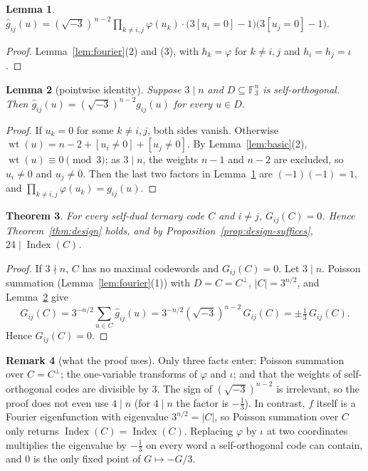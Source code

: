 \documentclass[11pt]{amsart}
\newtheorem{theorem}{Theorem}[section]
\newtheorem{lemma}[theorem]{Lemma}
\theoremstyle{definition}
\newtheorem{remark}[theorem]{Remark}
\newcommand{\F}{\mathbb{F}_3}
\newcommand{\wt}{\operatorname{wt}}
\newcommand{\Index}{\operatorname{Index}}
\newcommand{\isq}{\sqrt{-3}}
\begin{document}
\begin{lemma}\label{lem:ghat}
$\displaystyle\hat g_{ij}(u)=(\isq)^{\,n-2}\prod_{k\ne i,j}\varphi(u_k)\cdot\bigl(3[u_i=0]-1\bigr)\bigl(3[u_j=0]-1\bigr).$
\end{lemma}

\begin{proof}
Lemma~\ref{lem:fourier}(2) and (3), with $h_k=\varphi$ for $k\ne i,j$ and $h_i=h_j=\iota$.
\end{proof}

\begin{lemma}[pointwise identity]\label{lem:pointwise}
Suppose $3\mid n$ and $D\subseteq\F^n$ is self-orthogonal. Then $\hat g_{ij}(u)=(\isq)^{n-2}g_{ij}(u)$
for every $u\in D$.
\end{lemma}

\begin{proof}
If $u_k=0$ for some $k\ne i,j$, both sides vanish. Otherwise $\wt(u)=n-2+[u_i\ne0]+[u_j\ne0]$. By
Lemma~\ref{lem:basic}(2), $\wt(u)\equiv0\pmod3$; as $3\mid n$, the weights $n-1$ and $n-2$ are
excluded, so $u_i\ne0$ and $u_j\ne0$. Then the last two factors in Lemma~\ref{lem:ghat} are
$(-1)(-1)=1$, and $\prod_{k\ne i,j}\varphi(u_k)=g_{ij}(u)$.
\end{proof}

\begin{theorem}\label{thm:C}
For every self-dual ternary code $C$ and $i\ne j$, $G_{ij}(C)=0$. Hence Theorem~\ref{thm:design}
holds, and by Proposition~\ref{prop:design-suffices}, $24\mid\Index(C)$.
\end{theorem}

\begin{proof}
If $3\nmid n$, $C$ has no maximal codewords and $G_{ij}(C)=0$. Let $3\mid n$. Poisson summation
(Lemma~\ref{lem:fourier}(1)) with $D=C=C^\perp$, $|C|=3^{n/2}$, and Lemma~\ref{lem:pointwise} give
\[
  G_{ij}(C)=3^{-n/2}\sum_{u\in C}\hat g_{ij}(u)=3^{-n/2}(\isq)^{n-2}\,G_{ij}(C)=\pm\tfrac13\,G_{ij}(C).
\]
Hence $G_{ij}(C)=0$.
\end{proof}

\begin{remark}[what the proof uses]\label{rem:uses}
Only three facts enter: Poisson summation over $C=C^\perp$; the one-variable transforms of
$\varphi$ and $\iota$; and that the weights of self-orthogonal codes are divisible by $3$. The sign
of $(\isq)^{n-2}$ is irrelevant, so the proof does not even use $4\mid n$ (for $4\mid n$ the factor is
$-\frac13$). In contrast, $f$ itself is a Fourier eigenfunction with eigenvalue $3^{n/2}=|C|$, so
Poisson summation over $C$ only returns $\Index(C)=\Index(C)$. Replacing $\varphi$ by $\iota$ at two
coordinates multiplies the eigenvalue by $-\frac13$ on every word a self-orthogonal code can
contain, and $0$ is the only fixed point of $G\mapsto-G/3$.
\end{remark}
\end{document}
